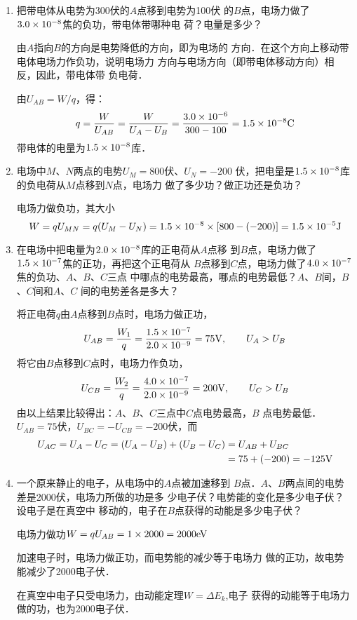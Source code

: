 \begin{enumerate}
	\item 把带电体从电势为300伏的$A$点移到电势为100伏
的$B$点，电场力做了$3.0\times10^{-8}$焦的负功，带电体带哪种电
荷？电量是多少？

\begin{solution}
    由$A$指向$B$的方向是电势降低的方向，即为电场的
    方向．在这个方向上移动带电体电场力作负功，说明电场力
    方向与电场方向（即带电体移动方向）相反，因此，带电体带
    负电荷．

    由$U_{AB}=W/q$，得：
    \[q=\frac{W}{U_{AB}}=\frac{W}{U_A-U_B}=\frac{3.0\times 10^{-6}}{300-100}=1.5\times 10^{-8}{\rm C}\]
    带电体的电量为$1.5\times 10^{-8}$库．
\end{solution}

\item 电场中$M$、$N$两点的电势$U_M=800$伏、$U_N=-200$
伏，把电量是$1.5\times10^{-8}$库的负电荷从$M$点移到$N$点，电场力
做了多少功？做正功还是负功？

\begin{solution}
    电场力做负功，其大小
  \[  W=qU_{MN}=q(U_M-U_N)=1.5\times10^{-8}\times[800-(-200)]=1.5\times10^{-5}{\rm J}\]
\end{solution}

\item 在电场中把电量为$2.0\times10^{-8}$库的正电荷从$A$点移
到$B$点，电场力做了$1.5\times10^{-7}$焦的正功，再把这个正电荷从
$B$点移到$C$点，电场力做了$4.0\times10^{-7}$焦的负功、$A$、$B$、$C$三点
中哪点的电势最高，哪点的电势最低？$A$、$B$间，$B$、$C$间和$A$、$C$
间的电势差各是多大？

\begin{solution}
    将正电荷$q$由$A$点移到$B$点时，电场力做正功，
   \[ U_{AB}=\frac{W_1}{q}=\frac{1.5\times 10^{-7}}{2.0\times 10^{-9}}=75{\rm V},\qquad U_A>U_B\]
    将它由$B$点移到$C$点时，电场力作负功，
    \[ U_{CB}=\frac{W_2}{q}=\frac{4.0\times 10^{-7}}{2.0\times 10^{-9}}=200{\rm V},\qquad U_C>U_B\]  
    由以上结果比较得出：$A$、$B$、$C$三点中$C$点电势最高，$B$
    点电势最低．$U_{AB}=75$伏，$U_{BC}=-U_{CB}=-200$伏，而
\[\begin{split}
    U_{AC}=U_A-U_C=(U_A-U_B)+(U_B-U_C)&=U_{AB}+U_{BC}\\
    &=75+(-200)=-125{\rm V}
\end{split}\]
\end{solution}

\item 一个原来静止的电子，从电场中的$A$点被加速移到
$B$点．$A$、$B$两点间的电势差是2000伏，电场力所做的功是多
少电子伏？电势能的变化是多少电子伏？设电子是在真空中
移动的，电子在$B$点获得的动能是多少电子伏？

\begin{solution}
    电场力做功$W=qU_{AB}=1\times2000=2000{\rm eV}$

    加速电子时，电场力做正功，而电势能的减少等于电场力
    做的正功，故电势能减少了2000电子伏．

    在真空中电子只受电场力，由动能定理$W=\Delta E_k$,电子
    获得的动能等于电场力做的功，也为2000电子伏．
\end{solution}

\end{enumerate}



